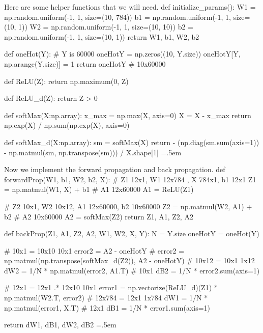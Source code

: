 \documentclass{article}
\newenvironment{cverbatim}
 {\SaveVerbatim{cverb}}
 {\endSaveVerbatim
  \flushleft\fboxrule=0pt\fboxsep=.5em
  \colorbox{cverbbg}{%
    \makebox[\dimexpr\linewidth-2\fboxsep][l]{\BUseVerbatim{cverb}}%
  }
  \endflushleft
}
\theoremstyle{definition}
\theoremstyle{remark}
\theoremstyle{definition}
\begin{document}
Here are some helper functions that we will need. 
\begin{cverbatim}
def initialize_params(): 
    W1 = np.random.uniform(-1, 1, size=(10, 784)) 
    b1 = np.random.uniform(-1, 1, size=(10, 1)) 
    W2 = np.random.uniform(-1, 1, size=(10, 10)) 
    b2 = np.random.uniform(-1, 1, size=(10, 1)) 
    return W1, b1, W2, b2 

def oneHot(Y): 
    # Y is 60000 
    oneHotY = np.zeros((10, Y.size))
    oneHotY[Y, np.arange(Y.size)] = 1 
    return oneHotY # 10x60000

def ReLU(Z): 
    return np.maximum(0, Z)

def ReLU_d(Z): 
    return Z > 0

def softMax(X:np.array): 
    x_max = np.max(X, axis=0)
    X = X - x_max
    return np.exp(X) / np.sum(np.exp(X), axis=0) 

def softMax_d(X:np.array): 
    sm = softMax(X)
    return - (np.diag(sm.sum(axis=1)) - np.matmul(sm, np.transpose(sm))) / X.shape[1]
\end{cverbatim}

Now we implement the forward propagation and back propagation. 
\begin{cverbatim}
def forwardProp(W1, b1, W2, b2, X): 
    # Z1 12x1, W1 12x784 , X 784x1, b1 12x1
    Z1 = np.matmul(W1, X) + b1
    # A1 12x60000
    A1 = ReLU(Z1) 
    
    # Z2 10x1, W2 10x12, A1 12x60000, b2 10x60000
    Z2 = np.matmul(W2, A1) + b2 
    # A2 10x60000
    A2 = softMax(Z2) 
    return Z1, A1, Z2, A2 

def backProp(Z1, A1, Z2, A2, W1, W2, X, Y): 
    N = Y.size
    oneHotY = oneHot(Y)
    
    # 10x1 = 10x10 10x1
    error2 = A2 - oneHotY
    # error2 = np.matmul(np.transpose(softMax_d(Z2)), A2 - oneHotY) 
    # 10x12 = 10x1 1x12
    dW2 = 1/N * np.matmul(error2, A1.T)
    # 10x1
    dB2 = 1/N * error2.sum(axis=1)
    
    # 12x1 = 12x1 .* 12x10 10x1
    error1 = np.vectorize(ReLU_d)(Z1) * np.matmul(W2.T, error2) 
    # 12x784 = 12x1 1x784
    dW1 = 1/N * np.matmul(error1, X.T)
    # 12x1 
    dB1 = 1/N * error1.sum(axis=1)

    return dW1, dB1, dW2, dB2 
\end{cverbatim}
\end{document}
